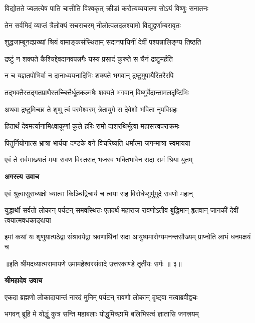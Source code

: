 \twolineshloka
{विद्योतते ज्वलत्येष पाति चात्तीति विश्वकृत्}
{क्रीडां करोत्यव्ययात्मा सोऽयं विष्णुः सनातनः} %

\twolineshloka
{तेन सर्वमिदं व्याप्तं त्रैलोक्यं सचराचरम्}
{नीलोत्पलदलश्यामो विद्युद्वर्णाम्बरावृतः} %

\twolineshloka
{शुद्धजाम्बूनदप्रख्यां श्रियं वामाङ्कसंस्थिताम्}
{सदानपायिनीं देवीं पश्यन्नालिङ्ग्य तिष्ठति} %

\twolineshloka
{द्रष्टुं न शक्यते कैश्चिद्देवदानवपन्नगैः}
{यस्य प्रसादं कुरुते स चैनं द्रष्टुमर्हति} %

\twolineshloka
{न च यज्ञतपोभिर्वा न दानाध्ययनादिभिः}
{शक्यते भगवान् द्रष्टुमुपायैरितरैरपि} %

\twolineshloka
{तद्भक्तैस्तद्गतप्राणैस्तच्चित्तैर्धूतकल्मषैः}
{शक्यते भगवान् विष्णुर्वेदान्तामलदृष्टिभिः} %

\twolineshloka
{अथवा द्रष्टुमिच्छा ते शृणु त्वं परमेश्वरम्}
{त्रेतायुगे स देवेशो भविता नृपविग्रहः} %

\twolineshloka
{हितार्थं देवमर्त्यानामिक्ष्वाकूणां कुले हरिः}
{रामो दाशरथिर्भूत्वा महासत्त्वपराक्रमः} %

\twolineshloka
{पितुर्नियोगात्स भ्रात्रा भार्यया दण्डके वने}
{विचरिष्यति धर्मात्मा जगन्मात्रा स्वमायया} %

\twolineshloka
{एवं ते सर्वमाख्यातं मया रावण विस्तरात्}
{भजस्व भक्तिभावेन सदा रामं श्रिया युतम्} %

\textbf{अगस्त्य उवाच}

\twolineshloka
{एवं श्रुत्वासुराध्यक्षो ध्यात्वा किञ्चिद्विचार्य च}
{त्वया सह विरोधेप्सुर्मुमुदे रावणो महान्} %

\threelineshloka
{युद्धार्थी सर्वतो लोकान् पर्यटन् समवस्थितः}
{एतदर्थं महाराज रावणोऽतीव बुद्धिमान्}
{हृतवान् जानकीं देवीं त्वयात्मवधकाङ्क्षया} %

\fourlineindentedshloka
{इमां कथां यः शृणुयात्पठेद्वा}
{संश्रावयेद्वा श्रवणार्थिनां सदा}
{आयुष्यमारोग्यमनन्तसौख्यम्}
{प्राप्नोति लाभं धनमक्षयं च} %

{॥इति श्रीमदध्यात्मरामायणे उमामहेश्वरसंवादे उत्तरकाण्डे
तृतीयः सर्गः ॥ ३॥
}




\textbf{श्रीमहादेव उवाच}

\twolineshloka
{एकदा ब्रह्मणो लोकादायान्तं नारदं मुनिम्}
{पर्यटन् रावणो लोकान् दृष्ट्वा नत्वाब्रवीद्वचः} %

\twolineshloka
{भगवन् ब्रूहि मे योद्धुं कुत्र सन्ति महाबलाः}
{योद्धुमिच्छामि बलिभिस्त्वं ज्ञातासि जगत्त्रयम्} %

